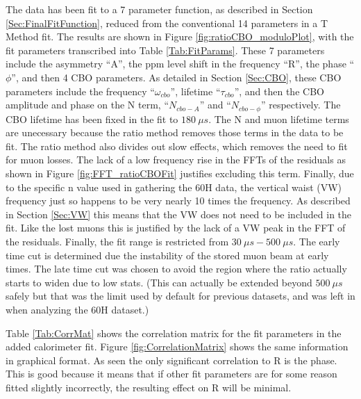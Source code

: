	The data has been fit to a 7 parameter function, as described in Section \ref{Sec:FinalFitFunction}, reduced from the conventional 14 parameters in a T Method fit. The results are shown in Figure \ref{fig:ratioCBO_moduloPlot}, with the fit parameters transcribed into Table \ref{Tab:FitParams}. These 7 parameters include the asymmetry ``A'', the ppm level shift in the \gmtwo frequency ``R'', the \gmtwo phase ``$\phi$'', and then 4 CBO parameters. As detailed in Section \ref{Sec:CBO}, these CBO parameters include the frequency ``$\omega_{cbo}$'', lifetime ``$\tau_{cbo}$'', and then the CBO amplitude and phase on the N term, ``$N_{cbo-A}$'' and ``$N_{cbo-\phi}$'' respectively. The CBO lifetime has been fixed in the fit to $\SI{180}{\mu s}$. The N and muon lifetime terms are unecessary because the ratio method removes those terms in the data to be fit. The ratio method also divides out slow effects, which removes the need to fit for muon losses. The lack of a low frequency rise in the FFTs of the residuals as shown in Figure \ref{fig:FFT_ratioCBOFit} justifies excluding this term. Finally, due to the specific n value used in gathering the 60H data, the vertical waist (VW) frequency just so happens to be very nearly 10 times the \gmtwo frequency. As described in Section \ref{Sec:VW} this means that the VW does not need to be included in the fit. Like the lost muons this is justified by the lack of a VW peak in the FFT of the residuals. Finally, the fit range is restricted from $\SI{30}{\mu s} - \SI{500}{\mu s}$. The early time cut is determined due the instability of the stored muon beam at early times. The late time cut was chosen to avoid the region where the ratio actually starts to widen due to low stats. (This can actually be extended beyond $\SI{500}{\mu s}$ safely but that was the limit used by default for previous datasets, and was left in when analyzing the 60H dataset.)

	Table \ref{Tab:CorrMat} shows the correlation matrix for the fit parameters in the added calorimeter fit. Figure \ref{fig:CorrelationMatrix} shows the same information in graphical format. As seen the only significant correlation to R is the \gmtwo phase. This is good because it means that if other fit parameters are for some reason fitted slightly incorrectly, the resulting effect on R will be minimal.


